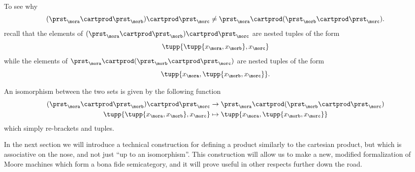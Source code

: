 To see why
\begin{equation}
    \label{eq:assoc-fails1}
    (\prst_{\mora} \cartprod \prst_{\morb}) \cartprod \prst_{\morc} \neq \prst_{\mora} \cartprod (\prst_{\morb} \cartprod \prst_{\morc}).
\end{equation}
recall that the elements of $(\prst_{\mora} \cartprod \prst_{\morb}) \cartprod \prst_{\morc}$ are nested tuples of the form 
$$\tupp{ \tupp{x_{\mora}, x_{\morb}}, x_{\morc} }$$ while the elements of $\prst_{\mora} \cartprod (\prst_{\morb} \cartprod \prst_{\morc})$ are nested tuples of the form $$\tupp{x_{\mora}, \tupp{x_{\morb}, x_{\morc}} }.$$

An isomorphism between the two sets is given by the following function 
\begin{equation}
    \label{eq:assoc-fails2}
    \begin{aligned}
        (\prst_{\mora} \cartprod \prst_{\morb}) \cartprod \prst_{\morc} & \to \prst_{\mora} \cartprod (\prst_{\morb} \cartprod \prst_{\morc}) \\
        \tupp{ \tupp{x_{\mora}, x_{\morb}}, x_{\morc} }                 & \mapsto \tupp{x_{\mora}, \tupp{x_{\morb}, x_{\morc}} }
    \end{aligned}
\end{equation}
which simply re-brackets and tuples. 

In the next section we will introduce a technical construction for defining a product similarly to the cartesian product, but which is associative on the nose, and not just ``up to an isomorphism''. This construction will allow us to make a new, modified formalization of Moore machines which form a bona fide semicategory, and it will prove useful in other respects further down the road. 

